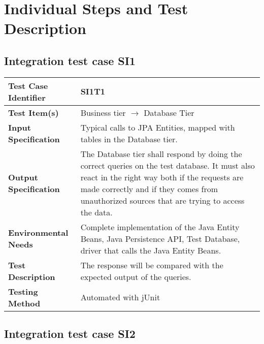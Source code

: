 \chapter{Individual Steps and Test Description}
\label{chap:individual-steps}

\section{Integration test case SI1}

\begin{tabular}{l p{}}
    \hline
    \textbf{Test Case Identifier} & SI1T1\\
    \hline
    \textbf{Test Item(s)} & Business tier $\rightarrow$ Database Tier\\
    \hline
    \textbf{Input Specification} & Typical calls to JPA Entities, mapped with tables in the Database tier.\\
    \hline
    \textbf{Output Specification} & The Database tier shall respond by doing the correct queries on the test database. It must also react in the right way both if the requests are made correctly and if they comes from unauthorized sources that are trying to access the data.\\
    \hline
    \textbf{Environmental Needs} & Complete implementation of the Java Entity Beans, Java Persistence API, Test Database, driver that calls the Java Entity Beans. \\
    \hline
    \textbf{Test Description} & The response will be compared with the expected output of the queries.\\
    \hline
    \textbf{Testing Method} & Automated with jUnit \\
    \hline
\end{tabular}

\vspace{2em}

\section{Integration test case SI2}

